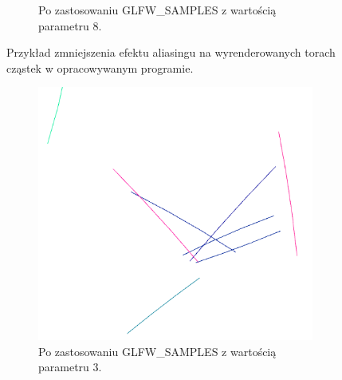 \begin{figure}[H]
\begin{subfigure}{0.45\textwidth}
    	\caption{Po zastosowaniu GLFW\_SAMPLES z wartością parametru 8.}
		\label{rys12}
	\end{subfigure}
    \caption{Przykład zmniejszenia efektu aliasingu na wyrenderowanych torach cząstek w opracowywanym programie.}
    \label{rys13}
\end{figure}

\begin{figure}[H]
	\begin{subfigure}{0.5\textwidth}
		\centering
 		\includegraphics[width=\textwidth]{Wart3.png}
    	\caption{Po zastosowaniu GLFW\_SAMPLES z wartością parametru 3.}
 		\label{rys15}
	\end{subfigure}
	\hfill
	\begin{subfigure}{0.5\textwidth}
		\centering

\end{subfigure}
\end{figure}
